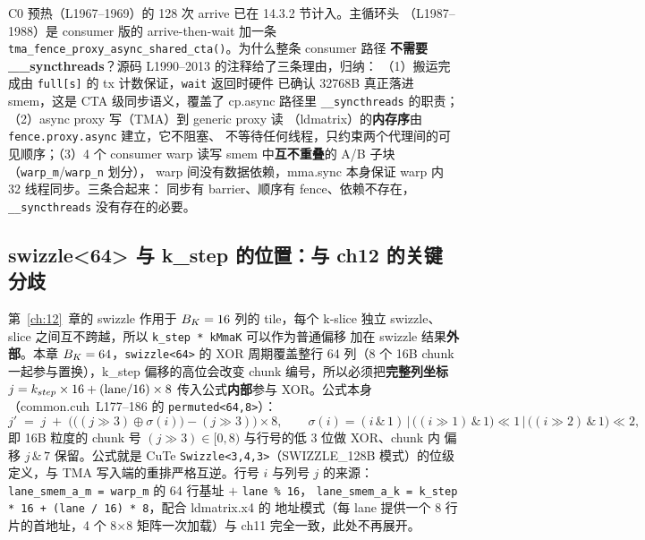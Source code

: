 

C0 预热（L1967--1969）的 128 次 arrive 已在 14.3.2 节计入。主循环头
（L1987--1988）是 consumer 版的 arrive-then-wait 加一条
\texttt{tma\_\allowbreak{}fence\_\allowbreak{}proxy\_\allowbreak{}async\_\allowbreak{}shared\_\allowbreak{}cta\allowbreak{}()}。为什么整条 consumer 路径
\textbf{不需要 \_\_syncthreads}？源码 L1990--2013 的注释给了三条理由，归纳：
（1）搬运完成由 \texttt{full[s]} 的 tx 计数保证，\texttt{wait} 返回时硬件
已确认 32768B 真正落进 smem，这是 CTA 级同步语义，覆盖了 cp.async 路径里
\texttt{\_\allowbreak{}\_\allowbreak{}syncthreads} 的职责；（2）async proxy 写（TMA）到 generic proxy 读
（ldmatrix）的\textbf{内存序}由 \texttt{fence.\allowbreak{}proxy.\allowbreak{}async} 建立，它不阻塞、
不等待任何线程，只约束两个代理间的可见顺序；（3）4 个 consumer warp 读写
smem 中\textbf{互不重叠}的 A/B 子块（\texttt{warp\_m}/\texttt{warp\_n} 划分），
warp 间没有数据依赖，mma.sync 本身保证 warp 内 32 线程同步。三条合起来：
同步有 barrier、顺序有 fence、依赖不存在，\texttt{\_\allowbreak{}\_\allowbreak{}syncthreads} 没有存在的必要。

\subsection{swizzle<64> 与 k\_step 的位置：与 ch12 的关键分歧}



第~\ref{ch:12}~章的 swizzle 作用于 $B\sb{K} = 16$ 列的 tile，每个 k-slice 独立
swizzle、slice 之间互不跨越，所以 \texttt{k\_step * kMmaK} 可以作为普通偏移
加在 swizzle 结果\textbf{外部}。本章 $B\sb{K} = 64$，\texttt{swizzle<64>} 的 XOR
周期覆盖整行 64 列（8 个 16B chunk 一起参与置换），k\_step 偏移的高位会改变
chunk 编号，所以必须把\textbf{完整列坐标} $j = k\sb{step} \times 16 + (\mathrm{lane}
/ 16) \times 8$ 传入公式\textbf{内部}参与 XOR。公式本身
（common.cuh~L177--186 的 \texttt{permuted\allowbreak{}<64,\allowbreak{}8>}）：
\begin{equation}
  j' \;=\; j \;+\; \Big( \big( (j \gg 3) \oplus \sigma(i) \big) - (j \gg 3)
  \Big) \times 8, \qquad
  \sigma(i) = (i\,\&\,1) \,\vert\, \big((i \gg 1)\,\&\,1\big) \ll 1 \,\vert\,
  \big((i \gg 2)\,\&\,1\big) \ll 2 ,
\end{equation}
即 16B 粒度的 chunk 号 $(j \gg 3) \in [0, 8)$ 与行号的低 3 位做 XOR、chunk 内
偏移 $j \,\&\, 7$ 保留。公式就是 CuTe \texttt{Swizzle\allowbreak{}<3,\allowbreak{}4,\allowbreak{}3>}（SWIZZLE\_128B
模式）的位级定义，与 TMA 写入端的重排严格互逆。行号 $i$ 与列号 $j$ 的来源：
\texttt{lane\_\allowbreak{}smem\_\allowbreak{}a\_\allowbreak{}m =\allowbreak{} warp\_\allowbreak{}m} 的 64 行基址 $+$ \texttt{lane \% 16}，
\texttt{lane\_\allowbreak{}smem\_\allowbreak{}a\_\allowbreak{}k =\allowbreak{} k\_\allowbreak{}step * 16 + \allowbreak{}(lane /\allowbreak{} 16) * 8}，配合 ldmatrix.x4 的
地址模式（每 lane 提供一个 8 行片的首地址，4 个 8$\times$8 矩阵一次加载）与
ch11 完全一致，此处不再展开。

